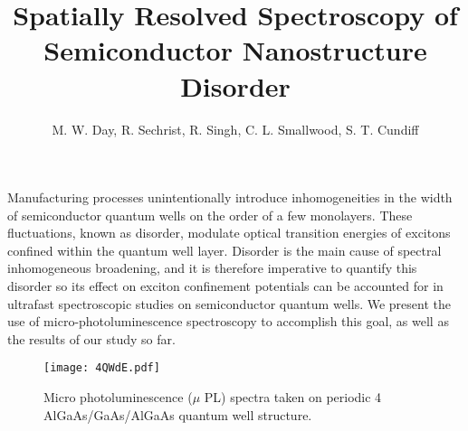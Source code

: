\documentclass[letterpaper,14pt,aps,reprint,notitlepage,onecolumn]{revtex4-1}
\begin{document}
\title{Spatially Resolved Spectroscopy of Semiconductor Nanostructure Disorder}
\author{M. W. Day, R. Sechrist, R. Singh, C. L. Smallwood, S. T. Cundiff}
\vspace{.5cm}
\address{$^1$ JILA, University of Colorado \& National Institute of Standards and Technology, Boulder CO 80309, USA}
\address{$^2$ Department of Physics, University of Michigan, Ann Arbor, MI 48109, USA}
\maketitle
\vspace{0cm}

Manufacturing processes unintentionally introduce inhomogeneities in the width of semiconductor quantum wells on the order of  a few monolayers. These fluctuations, known as disorder, modulate optical transition energies of excitons confined within the quantum well layer. Disorder is the main cause of spectral inhomogeneous broadening, and it is therefore imperative to quantify this disorder so its effect on exciton confinement potentials can be accounted for in ultrafast spectroscopic studies on semiconductor quantum wells. We present the use of micro-photoluminescence spectroscopy to accomplish this goal, as well as the results of our study so far.

\begin{figure}[h!]
\begin{center}
\texttt{[image: 4QWdE.pdf]}
\caption{Micro photoluminescence ($\mu$ PL) spectra taken on periodic 4 AlGaAs/GaAs/AlGaAs quantum well structure.}
\end{center}
\end{figure}
\end{document}
